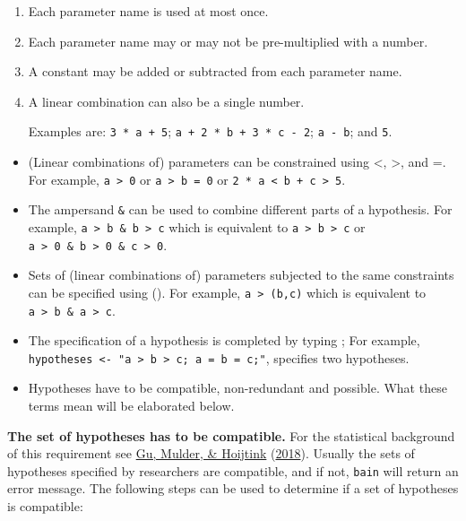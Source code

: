 \documentclass[
]{book}
\providecommand{\tightlist}{%
  \setlength{\itemsep}{0pt}\setlength{\parskip}{0pt}}
\begin{document}
\begin{enumerate}
\def\labelenumi{\alph{enumi})}
\item
  Each parameter name is used at most once.
\item
  Each parameter name may or may not be pre-multiplied with a number.
\item
  A constant may be added or subtracted from each parameter name.
\item
  A linear combination can also be a single number.

  Examples are: \texttt{3\ *\ a\ +\ 5}; \texttt{a\ +\ 2\ *\ b\ +\ 3\ *\ c\ -\ 2}; \texttt{a\ -\ b}; and \texttt{5}.
\end{enumerate}

\begin{itemize}
\tightlist
\item
  (Linear combinations of) parameters can be constrained using \textless, \textgreater, and
  =. For example, \texttt{a\ \textgreater{}\ 0} or
  \texttt{a\ \textgreater{}\ b\ =\ 0} or \texttt{2\ *\ a\ \textless{}\ b\ +\ c\ \textgreater{}\ 5}.
\item
  The ampersand \texttt{\&} can be used to combine different parts of a hypothesis.
  For example, \texttt{a\ \textgreater{}\ b\ \&\ b\ \textgreater{}\ c} which is equivalent to \texttt{a\ \textgreater{}\ b\ \textgreater{}\ c} or
  \texttt{a\ \textgreater{}\ 0\ \&\ b\ \textgreater{}\ 0\ \&\ c\ \textgreater{}\ 0}.
\item
  Sets of (linear combinations of) parameters subjected to the same
  constraints can be specified using (). For
  example, \texttt{a\ \textgreater{}\ (b,c)} which is equivalent to \texttt{a\ \textgreater{}\ b\ \&\ a\ \textgreater{}\ c}.
\item
  The specification of a hypothesis is completed by typing ; For example,
  \texttt{hypotheses\ \textless{}-\ "a\ \textgreater{}\ b\ \textgreater{}\ c;\ a\ =\ b\ =\ c;"}, specifies two hypotheses.
\item
  Hypotheses have to be compatible, non-redundant and possible. What
  these terms mean will be elaborated below.
\end{itemize}

\textbf{The set of hypotheses has to be compatible.} For the statistical
background of this requirement see \protect\hyperlink{ref-gu2018approximated}{Gu, Mulder, \& Hoijtink} (\protect\hyperlink{ref-gu2018approximated}{2018}). Usually the
sets of hypotheses specified by researchers are compatible, and if not,
\texttt{bain} will return an error message. The following steps can be used to
determine if a set of hypotheses is compatible:
\end{document}
